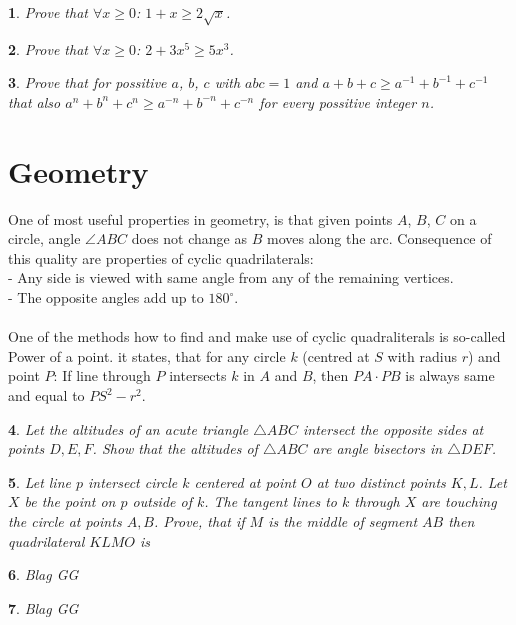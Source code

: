 \documentclass[12pt]{article}
\newtheorem{problem}{}
\begin{document}
\begin{problem}
Prove that $\forall x\ge 0$: $1 + x \ge 2\sqrt{x}$.
\end{problem}
\begin{problem}
Prove that $\forall x\ge 0$: $2 + 3x^5 \ge 5x^3$.
\end{problem}
\begin{problem}
Prove that for possitive $a$, $b$, $c$ with $abc = 1$ and $a+b+c \ge a^{-1} + b^{-1} + c^{-1}$ that also $a^n+b^n+c^n \ge a^{-n} + b^{-n} + c^{-n}$ for every possitive integer $n$.
\end{problem}

\section{Geometry}

One of most useful properties in geometry, is that given points $A$, $B$, $C$ on a circle, angle $\angle ABC$ does not change as $B$ moves along the arc. Consequence of this quality are properties of cyclic quadrilaterals:\\
- Any side is viewed with same angle from any of the remaining vertices.\\
- The opposite angles add up to $180^\circ$.\\
\\One of the methods how to find and make use of cyclic quadraliterals is so-called Power of a point. it states, that for any circle $k$ (centred at $S$ with radius $r$) and point $P$: If line through $P$ intersects $k$ in $A$ and $B$, then $PA \cdot PB$ is always same and equal to $PS^2 - r^2$.

\begin{problem}
Let the altitudes of an acute triangle $\triangle ABC$ intersect the opposite sides at points $D, E, F$.	Show that the altitudes of $\triangle ABC$ are angle bisectors in $\triangle DEF$.
\end{problem}

\begin{problem}
Let line $p$ intersect circle $k$ centered at point $O$ at two distinct points $K, L$. Let $X$ be the point on $p$ outside of $k$. The tangent lines to $k$ through $X$ are touching the circle at points $A, B$. Prove, that if $M$ is the middle of segment $AB$ then quadrilateral $KLMO$ is  
\end{problem}

\begin{problem}
Blag GG
\end{problem}

\begin{problem}
Blag GG
\end{problem}
\end{document}
